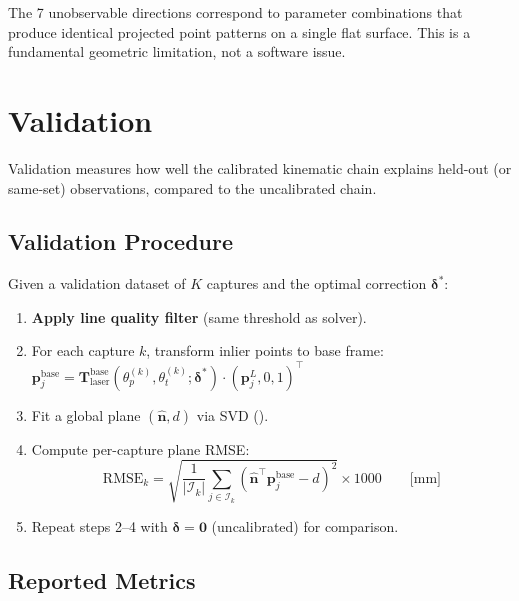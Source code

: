 \documentclass[12pt,a4paper]{article}
\newcommand{\T}{\mathbf{T}}
\newcommand{\nh}{\hat{\mathbf{n}}}
\newcommand{\pvec}{\mathbf{p}}
\begin{document}
The 7 unobservable directions correspond to parameter combinations that
produce identical projected point patterns on a single flat surface.
This is a fundamental geometric limitation, not a software issue.


\section{Validation}
\label{sec:validation}

Validation measures how well the calibrated kinematic chain explains
held-out (or same-set) observations, compared to the uncalibrated chain.

\subsection{Validation Procedure}

Given a validation dataset of $K$ captures and the optimal correction
$\bm{\delta}^*$:

\begin{enumerate}[nosep]
    \item \textbf{Apply line quality filter} (same threshold as solver).
    \item For each capture $k$, transform inlier points to base frame:
          $\pvec_j^{\text{base}} = \T_{\text{laser}}^{\text{base}}(\theta_p^{(k)}, \theta_t^{(k)}; \bm{\delta}^*) \cdot (\pvec_j^L, 0, 1)^\top$
    \item Fit a global plane $(\nh, d)$ via SVD ().
    \item Compute per-capture plane RMSE:
          \begin{equation}
              \text{RMSE}_k = \sqrt{\frac{1}{|\mathcal{I}_k|} \sum_{j \in \mathcal{I}_k}
              (\nh^\top \pvec_j^{\text{base}} - d)^2} \times 1000
              \qquad \text{[mm]}
              \label{eq:val_rmse}
          \end{equation}
    \item Repeat steps 2--4 with $\bm{\delta} = \mathbf{0}$
          (uncalibrated) for comparison.
\end{enumerate}

\subsection{Reported Metrics}
\end{document}
